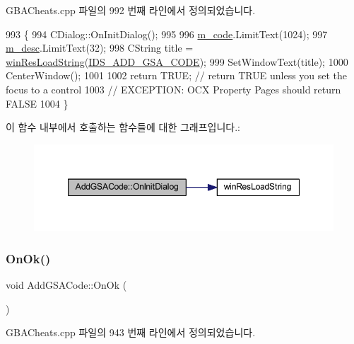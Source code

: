 G\+B\+A\+Cheats.\+cpp 파일의 992 번째 라인에서 정의되었습니다.


\begin{DoxyCode}
993 \{
994   CDialog::OnInitDialog();
995   
996   \mbox{\hyperlink{class_add_g_s_a_code_a0a4c3486121bd6be93e8f64215fea1ab}{m\_code}}.LimitText(1024);
997   \mbox{\hyperlink{class_add_g_s_a_code_a766cb9061a235616a856d3c1b16879db}{m\_desc}}.LimitText(32);
998   CString title = \mbox{\hyperlink{_win_res_util_8cpp_a416e85e80ab9b01376e87251c83d1a5a}{winResLoadString}}(\mbox{\hyperlink{resource_8h_a49836eba8e0beeff1d7e166eea41a5eb}{IDS\_ADD\_GSA\_CODE}});
999   SetWindowText(title);
1000   CenterWindow();
1001   
1002   \textcolor{keywordflow}{return} TRUE;  \textcolor{comment}{// return TRUE unless you set the focus to a control}
1003                 \textcolor{comment}{// EXCEPTION: OCX Property Pages should return FALSE}
1004 \}
\end{DoxyCode}
이 함수 내부에서 호출하는 함수들에 대한 그래프입니다.\+:
\nopagebreak
\begin{figure}[H]
\begin{center}
\leavevmode
\includegraphics[width=347pt]{class_add_g_s_a_code_af6ea2661ff2da964833f9e86f88cb1ff_cgraph}
\end{center}
\end{figure}
\mbox{\label{class_add_g_s_a_code_a857608ad314694d15ee6e811fb528d0b}} 
\subsubsection{\texorpdfstring{On\+Ok()}{OnOk()}}
{\footnotesize\ttfamily void Add\+G\+S\+A\+Code\+::\+On\+Ok (\begin{DoxyParamCaption}{ }\end{DoxyParamCaption})\hspace{0.3cm}{\ttfamily [protected]}}



G\+B\+A\+Cheats.\+cpp 파일의 943 번째 라인에서 정의되었습니다.


